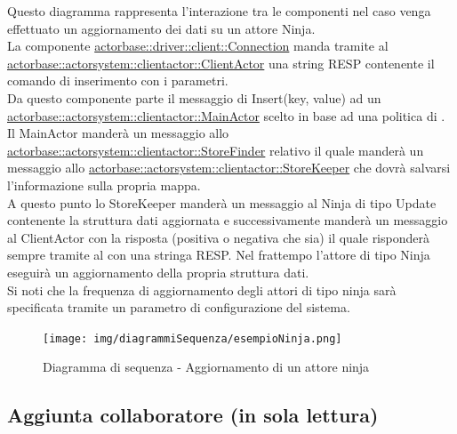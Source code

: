\documentclass{scalatekids-article}
\begin{document}
Questo diagramma rappresenta l'interazione tra le componenti nel caso venga 
effettuato un aggiornamento dei dati su un attore Ninja.\\
La componente \hyperref[sec:actorbase::driver::client::Connection]{actorbase::driver::client::Connection} 
manda tramite  al \hyperref[sec:actorbase::actorsystem::clientactor::ClientActor]{actorbase::actorsystem::clientactor::ClientActor} 
una string RESP contenente il comando di inserimento  con 
i parametri.\\ %
Da questo componente parte il messaggio di Insert(key, value) ad un \hyperref[sec:actorbase::actorsystem::clientactor::MainActor]{actorbase::actorsystem::clientactor::MainActor} scelto in base ad una 
politica di . Il MainActor manderà un messaggio allo \hyperref[sec:actorbase::actorsystem::clientactor::StoreFinder]{actorbase::actorsystem::clientactor::StoreFinder} relativo il quale manderà un messaggio allo \hyperref[sec:actorbase::actorsystem::clientactor::StoreKeeper]{actorbase::actorsystem::clientactor::StoreKeeper} che dovrà salvarsi l'informazione 
sulla propria mappa.\\
A questo punto lo StoreKeeper manderà un messaggio al Ninja di tipo Update contenente la struttura dati aggiornata e successivamente manderà un 
messaggio al ClientActor con la risposta (positiva o negativa che sia) 
il quale risponderà sempre tramite  al  con 
una stringa RESP.
Nel frattempo l'attore di tipo Ninja eseguirà un aggiornamento della propria struttura dati.\\
Si noti che la frequenza di aggiornamento degli attori di tipo ninja sarà 
specificata tramite un parametro di configurazione del sistema.
\begin{figure}[H]
  \begin{center}
    \texttt{[image: img/diagrammiSequenza/esempioNinja.png]}
    \caption{Diagramma di sequenza - Aggiornamento di un attore ninja}
  \end{center}
\end{figure}

\subsection{Aggiunta collaboratore (in sola lettura)}
\end{document}
